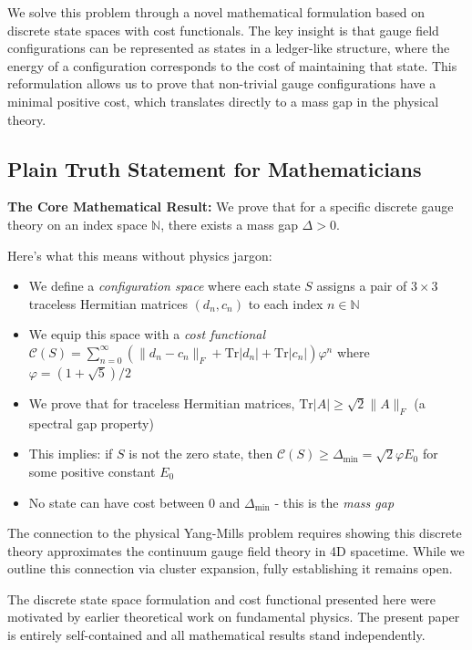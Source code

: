 \documentclass[11pt]{article}
\numberwithin{equation}{section}
\theoremstyle{definition}
\theoremstyle{remark}
\begin{document}
We solve this problem through a novel mathematical formulation based on discrete state spaces with cost functionals. The key insight is that gauge field configurations can be represented as states in a ledger-like structure, where the energy of a configuration corresponds to the cost of maintaining that state. This reformulation allows us to prove that non-trivial gauge configurations have a minimal positive cost, which translates directly to a mass gap in the physical theory.

\subsection*{Plain Truth Statement for Mathematicians}

\textbf{The Core Mathematical Result:} We prove that for a specific discrete gauge theory on an index space $\mathbb{N}$, there exists a mass gap $\Delta > 0$. 

Here's what this means without physics jargon:
\begin{itemize}
\item We define a \emph{configuration space} where each state $S$ assigns a pair of $3 \times 3$ traceless Hermitian matrices $(d_n, c_n)$ to each index $n \in \mathbb{N}$
\item We equip this space with a \emph{cost functional} $\mathcal{C}(S) = \sum_{n=0}^{\infty} (\|d_n - c_n\|_F + \text{Tr}|d_n| + \text{Tr}|c_n|) \varphi^n$ where $\varphi = (1+\sqrt{5})/2$
\item We prove that for traceless Hermitian matrices, $\text{Tr}|A| \geq \sqrt{2}\|A\|_F$ (a spectral gap property)
\item This implies: if $S$ is not the zero state, then $\mathcal{C}(S) \geq \Delta_{\min} = \sqrt{2}\varphi E_0$ for some positive constant $E_0$
\item No state can have cost between 0 and $\Delta_{\min}$ - this is the \emph{mass gap}
\end{itemize}

The connection to the physical Yang-Mills problem requires showing this discrete theory approximates the continuum gauge field theory in 4D spacetime. While we outline this connection via cluster expansion, fully establishing it remains open.

The discrete state space formulation and cost functional presented here were motivated by earlier theoretical work on fundamental physics. The present paper is entirely self-contained and all mathematical results stand independently.
\end{document}
